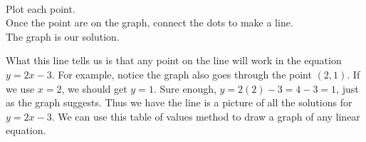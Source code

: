 \begin{example}
\begin{multicols}{2}
    \
    
     Plot each point.\\
    
     Once the point are on the graph, connect the dots to make a line.\\
    
     The graph is our solution.
  \end{multicols}
\end{example}

 What this line tells us is that any point on the line will work in the
equation $y = 2 x - 3$. For example, notice the graph also goes through the
point $(2, 1)$. If we use $x = 2$, we should get $y = 1$. Sure enough, $y = 2
(2) - 3 = 4 - 3 = 1$, just as the graph suggests. Thus we have the line is a
picture of all the solutions for $y = 2 x - 3$. We can use this table of
values method to draw a graph of any linear equation.

